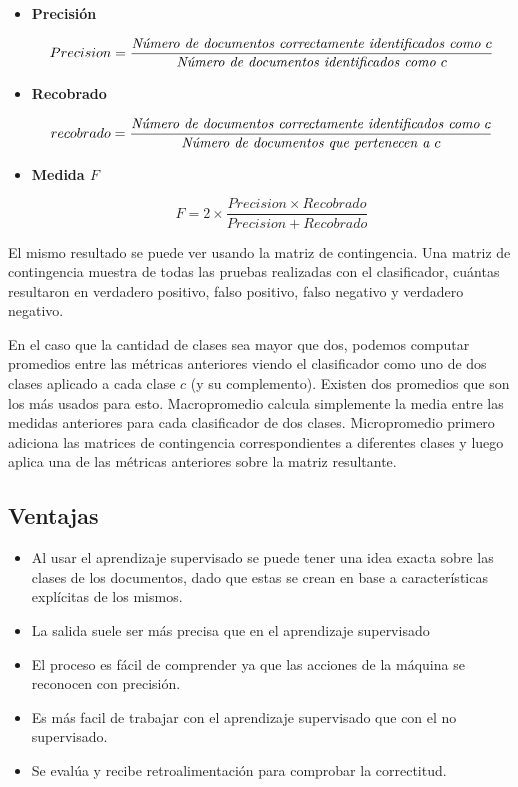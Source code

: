 \documentclass{llncs}
\begin{document}
			\begin{itemize}
				
				\item\textbf{Precisi\'on}
				
				\[
				Precision = \frac{\emph{N\'umero de documentos correctamente identificados como $c$} }{\emph{N\'umero de documentos identificados como $c$}}
				\]
				
				\item\textbf{Recobrado}
				
				\[
				recobrado = \frac{\emph{N\'umero de documentos correctamente identificados como $c$} }{\emph{N\'umero de documentos que pertenecen a $c$}}
				\]
				
				\item\textbf{Medida $F$} 
				
				\[
					F = 2 \times  \frac{Precision \times Recobrado}{Precision + Recobrado}
				\]
				
				
			\end{itemize}
			
			El mismo resultado se puede ver usando la matriz de contingencia. Una matriz de contingencia muestra de todas las pruebas realizadas con el clasificador, cu\'antas resultaron en verdadero positivo, falso positivo, falso negativo y verdadero negativo.
			
			En el caso que la cantidad de clases sea mayor que dos, podemos computar promedios entre las m\'etricas anteriores viendo el clasificador como uno de dos clases aplicado a cada clase $c$ (y su complemento). Existen dos promedios que son los m\'as usados para esto. Macropromedio calcula simplemente la media entre las medidas anteriores para cada clasificador de dos clases. Micropromedio primero adiciona las matrices de contingencia correspondientes a diferentes clases y luego aplica una de las m\'etricas anteriores sobre la matriz resultante. 
			
			
	\subsection{Ventajas}
				\begin{itemize}
					\item Al usar el aprendizaje supervisado se puede tener una idea exacta sobre las clases de los documentos, dado que estas se crean en base a caracter\'isticas expl\'icitas de los mismos. 
					\item La salida suele ser m\'as precisa que en el aprendizaje supervisado
					\item El proceso es f\'acil de comprender ya que las acciones de la m\'aquina se reconocen con precisi\'on.
					\item Es m\'as facil de trabajar con el aprendizaje supervisado que con el no supervisado. 
					\item Se eval\'ua y recibe retroalimentaci\'on para comprobar la correctitud. 
				\end{itemize}
		
\end{document}
